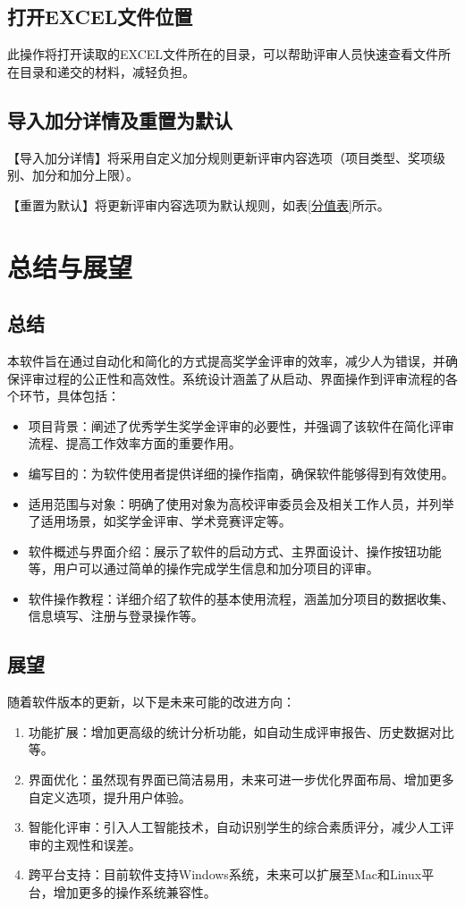 \documentclass[12pt]{report}
\begin{document}
	 
	 \textcolor{myred}{
		\section{打开EXCEL文件位置}
		此操作将打开读取的EXCEL文件所在的目录，可以帮助评审人员快速查看文件所在目录和递交的材料，减轻负担。
	} 
	
	\textcolor{mygreen}{
		\section{导入加分详情及重置为默认}
		【导入加分详情】将采用自定义加分规则更新评审内容选项（项目类型、奖项级别、加分和加分上限）。
	}
	
	\textcolor{mygreen}{
		【重置为默认】将更新评审内容选项为默认规则，如表\ref{分值表}所示。
	} 
	
	\chapter{总结与展望}
	\section{总结}
	本软件旨在通过自动化和简化的方式提高奖学金评审的效率，减少人为错误，并确保评审过程的公正性和高效性。系统设计涵盖了从启动、界面操作到评审流程的各个环节，具体包括：
	
\begin{itemize}
	\item 	项目背景：阐述了优秀学生奖学金评审的必要性，并强调了该软件在简化评审流程、提高工作效率方面的重要作用。
	\item 	编写目的：为软件使用者提供详细的操作指南，确保软件能够得到有效使用。
	\item 	适用范围与对象：明确了使用对象为高校评审委员会及相关工作人员，并列举了适用场景，如奖学金评审、学术竞赛评定等。
	\item 	软件概述与界面介绍：展示了软件的启动方式、主界面设计、操作按钮功能等，用户可以通过简单的操作完成学生信息和加分项目的评审。
	\item 	软件操作教程：详细介绍了软件的基本使用流程，涵盖加分项目的数据收集、信息填写、注册与登录操作等。
\end{itemize}
	\section{展望}
	随着软件版本的更新，以下是未来可能的改进方向：
	
\begin{enumerate}
	\item 	功能扩展：增加更高级的统计分析功能，如自动生成评审报告、历史数据对比等。
	\item 	界面优化：虽然现有界面已简洁易用，未来可进一步优化界面布局、增加更多自定义选项，提升用户体验。
	\item 	智能化评审：引入人工智能技术，自动识别学生的综合素质评分，减少人工评审的主观性和误差。
	\item 	跨平台支持：目前软件支持Windows系统，未来可以扩展至Mac和Linux平台，增加更多的操作系统兼容性。
\end{enumerate}
\end{document}
